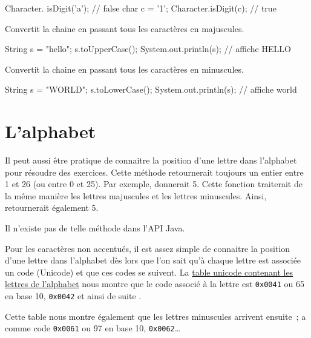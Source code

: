 \begin{description}
		\begin{java}
Character. isDigit('a');  // false
char c = '1';
Character.isDigit(c);   // true			
		\end{java}
	
	\item[\pc{toUpperCase}]
		Convertit la chaine en passant tous les caractères en majuscules.
		

		\begin{java}
String s = "hello";
s.toUpperCase();
System.out.println(s);		// affiche HELLO
		\end{java}

	\item[\pc{toLowerCase}]
		Convertit la chaine en passant tous les caractères en minuscules.
		

		\begin{java}
String s = "WORLD";
s.toLowerCase();
System.out.println(s);		// affiche world
		\end{java}
	
	\end{description}
	

\section{L’alphabet}

	Il peut aussi être pratique de connaitre la position d’une lettre dans
	l’alphabet pour résoudre des exercices. Cette méthode retournerait toujours
	un entier entre 1 et 26 (ou entre 0 et 25). Par exemple,
	 donnerait 5. Cette fonction traiterait de la même
	manière les lettres majuscules et les lettres minuscules. Ainsi,
	 retournerait également 5. 

	Il n'existe pas de telle méthode dans l'API Java. 
	
	Pour les caractères non accentués, il est assez simple de connaitre la
	position d'une lettre dans l'alphabet dès lors que l'on sait qu'à chaque
	lettre est associée un code (Unicode) et que ces codes se suivent. La
	\href{https://www.unicode.org/charts/PDF/U0000.pdf}{table unicode contenant
	les lettres de l'alphabet} nous montre que le code associé à la lettre
	 est \texttt{0x0041} ou 65 en base 10,  \texttt{0x0042} et
	ainsi de suite \cite{pbt-unicode}. 
		
	Cette table nous montre également que les lettres minuscules arrivent
	ensuite~;  a comme code \texttt{0x0061} ou 97 en base 10, 
	\texttt{0x0062}…

